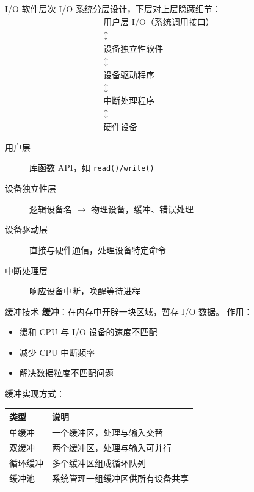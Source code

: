\documentclass[10pt, aspectratio=169]{beamer}
\begin{document}
\begin{frame}{I/O 软件层次}
    I/O 系统分层设计，下层对上层隐藏细节：
    \vspace{0.5em}
    \[
    \begin{array}{c}
        \text{用户层 I/O（系统调用接口）} \\
        \updownarrow \\
        \text{设备独立性软件} \\
        \updownarrow \\
        \text{设备驱动程序} \\
        \updownarrow \\
        \text{中断处理程序} \\
        \updownarrow \\
        \text{硬件设备}
    \end{array}
    \]
    \vspace{0.5em}
    \begin{description}
        \item[用户层] 库函数 API，如 \texttt{read()/write()}
        \item[设备独立性层] 逻辑设备名 $\rightarrow$ 物理设备，缓冲、错误处理
        \item[设备驱动层] 直接与硬件通信，处理设备特定命令
        \item[中断处理层] 响应设备中断，唤醒等待进程
    \end{description}
\end{frame}

\begin{frame}{缓冲技术}
    \textbf{缓冲}：在内存中开辟一块区域，暂存 I/O 数据。
    \vspace{0.5em}
    作用：
    \begin{itemize}
        \item 缓和 CPU 与 I/O 设备的速度不匹配
        \item 减少 CPU 中断频率
        \item 解决数据粒度不匹配问题
    \end{itemize}
    \vspace{0.5em}
    缓冲实现方式：
    \begin{center}
        \begin{tabular}{|l|l|}
            \hline
            \textbf{类型} & \textbf{说明} \\
            \hline
            单缓冲 & 一个缓冲区，处理与输入交替 \\
            双缓冲 & 两个缓冲区，处理与输入可并行 \\
            循环缓冲 & 多个缓冲区组成循环队列 \\
            缓冲池 & 系统管理一组缓冲区供所有设备共享 \\
            \hline
        \end{tabular}
    \end{center}
\end{frame}
\end{document}

